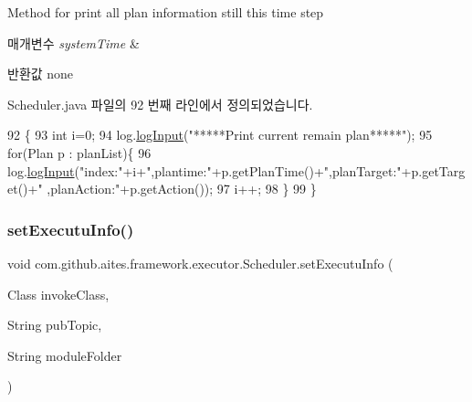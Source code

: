 Method for print all plan information still this time step 


\begin{DoxyParams}{매개변수}
{\em system\+Time} & \\
\hline
\end{DoxyParams}
\begin{DoxyReturn}{반환값}
none 
\end{DoxyReturn}


Scheduler.\+java 파일의 92 번째 라인에서 정의되었습니다.


\begin{DoxyCode}
92                               \{
93         \textcolor{keywordtype}{int} i=0;
94         log.\mbox{\hyperlink{classcom_1_1github_1_1aites_1_1framework_1_1log_1_1_log_writter_ad2c412c85ba5932c7fa4f920c50f44c9}{logInput}}(\textcolor{stringliteral}{"*****Print current remain plan*****"});
95         \textcolor{keywordflow}{for}(Plan p : planList)\{
96             log.\mbox{\hyperlink{classcom_1_1github_1_1aites_1_1framework_1_1log_1_1_log_writter_ad2c412c85ba5932c7fa4f920c50f44c9}{logInput}}(\textcolor{stringliteral}{"index:"}+i+\textcolor{stringliteral}{",plantime:"}+p.getPlanTime()+\textcolor{stringliteral}{",planTarget:"}+p.getTarget()+\textcolor{stringliteral}{"
      ,planAction:"}+p.getAction());
97             i++;
98         \}
99     \}
\end{DoxyCode}
\mbox{\label{classcom_1_1github_1_1aites_1_1framework_1_1executor_1_1_scheduler_a7243abfd0c8967008291bce9dc7f057f}} 
\subsubsection{\texorpdfstring{set\+Executu\+Info()}{setExecutuInfo()}}
{\footnotesize\ttfamily void com.\+github.\+aites.\+framework.\+executor.\+Scheduler.\+set\+Executu\+Info (\begin{DoxyParamCaption}\item[{Class}]{invoke\+Class,  }\item[{String}]{pub\+Topic,  }\item[{String}]{module\+Folder }\end{DoxyParamCaption})}



